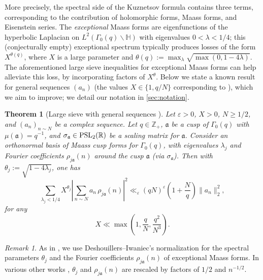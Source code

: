 \documentclass[reqno,11pt]{amsart}
\newtheorem{knowntheorem}{Theorem}
\theoremstyle{remark}
\newtheorem*{remark}{Remark}
\numberwithin{equation}{section}
\newcommand{\Z}{\mathbb{Z}}
\newcommand{\R}{\mathbb{R}}
\renewcommand{\H}{\mathbb{H}}
\newcommand{\ma}{\mathfrak{a}}
\newcommand{\PSL}{\textnormal{PSL}}
\newcommand{\eps}{\varepsilon}
\begin{document}
More precisely, the spectral side of the Kuznetsov formula contains three terms, corresponding to the contribution of holomorphic forms, Maass forms, and Eisenstein series. The \emph{exceptional} Maass forms are eigenfunctions of the hyperbolic Laplacian on $L^2(\Gamma_0(q) \backslash \H)$ with eigenvalues $0 < \lambda < 1/4$; this (conjecturally empty) exceptional spectrum typically produces losses of the form $X^{\theta(q)}$, where $X$ is a large parameter and $\theta(q) := \max_\lambda \sqrt{\max(0, 1 - 4\lambda)}$. The aforementioned large sieve inequalities for exceptional Maass forms can help alleviate this loss, by incorporating factors of $X^{\theta}$.
Below we state a known result for general sequences $(a_n)$ (the values $X \in \{1, q/N\}$ corresponding to \cite[Theorems 2 and 5]{deshouillers1982kloosterman}), which we aim to improve; we detail our notation in \cref{sec:notation}.


\begin{knowntheorem}[Large sieve with general sequences \cite{deshouillers1982kloosterman}] \label{thm:large-sieve-general}
Let $\eps > 0$, $X > 0$, $N \ge 1/2$, and $(a_n)_{n \sim N}$ be a complex sequence. Let $q \in \Z_+$, $\ma$ be a cusp of $\Gamma_0(q)$ with $\mu(\ma) = q^{-1}$, and $\sigma_{\ma} \in \PSL_2(\R)$ be a scaling matrix for $\ma$. Consider an orthonormal basis of Maass cusp forms for $\Gamma_0(q)$, with eigenvalues $\lambda_j$ and Fourier coefficients $\rho_{j\ma}(n)$ around the cusp $\ma$ (via $\sigma_{\ma}$). Then with $\theta_j := \sqrt{1 - 4\lambda_j}$, one has 
\begin{equation} \label{eq:large-sieve-general}
    \sum_{\lambda_j < 1/4}
    X^{\theta_j} 
    \left\vert 
    \sum_{n \sim N} a_n\, \rho_{j\ma}(n)
    \right\vert^2 
    \ll_\eps 
    (qN)^\eps
    \left(1 + \frac{N}{q}\right) \|a_n\|_2^2,
\end{equation}
for any
\begin{equation} \label{eq:basic-X-range}
    X \ll \max\left(1, \frac{q}{N}, \frac{q^2}{N^3}\right).
\end{equation}
\end{knowntheorem}

\begin{remark}
As in \cite{maynard2020primes,pascadi2023smooth,lichtman2023primes}, we use Deshouillers--Iwaniec's normalization \cite{deshouillers1982kloosterman} for the spectral parameters $\theta_j$ and the Fourier coefficients $\rho_{j\ma}(n)$ of exceptional Maass forms. In various other works \cite{topacogullari2018shifted,drappeau2017sums,de2020niveau,merikoski2023largest}, $\theta_j$ and $\rho_{j\ma}(n)$ are rescaled by factors of $1/2$ and $n^{-1/2}$.
\end{remark}
\end{document}
